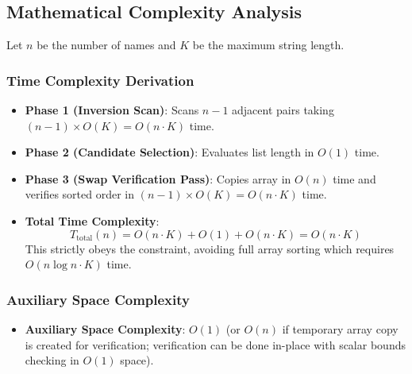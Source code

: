 \subsection{Mathematical Complexity Analysis}
Let $n$ be the number of names and $K$ be the maximum string length.

\subsubsection{Time Complexity Derivation}
\begin{itemize}
    \item \textbf{Phase 1 (Inversion Scan)}: Scans $n-1$ adjacent pairs taking $(n-1) \times O(K) = O(n \cdot K)$ time.
    \item \textbf{Phase 2 (Candidate Selection)}: Evaluates list length in $O(1)$ time.
    \item \textbf{Phase 3 (Swap Verification Pass)}: Copies array in $O(n)$ time and verifies sorted order in $(n-1) \times O(K) = O(n \cdot K)$ time.
    \item \textbf{Total Time Complexity}:
    \[
    T_{\text{total}}(n) = O(n \cdot K) + O(1) + O(n \cdot K) = O(n \cdot K)
    \]
    This strictly obeys the constraint, avoiding full array sorting which requires $O(n \log n \cdot K)$ time.
\end{itemize}

\subsubsection{Auxiliary Space Complexity}
\begin{itemize}
    \item \textbf{Auxiliary Space Complexity}: $O(1)$ (or $O(n)$ if temporary array copy is created for verification; verification can be done in-place with scalar bounds checking in $O(1)$ space).
\end{itemize}
